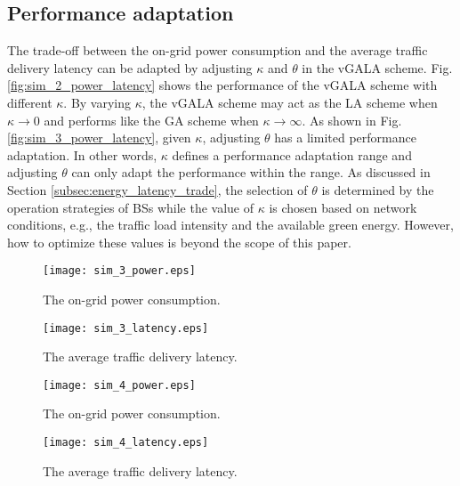 \documentclass[journal]{IEEEtran}
\theoremstyle{definition}
\begin{document}
\subsection{Performance adaptation}
The trade-off between the on-grid power consumption and the average traffic delivery latency can be adapted by adjusting $\kappa$ and $\theta$ in the vGALA scheme. Fig. \ref{fig:sim_2_power_latency} shows the performance of the vGALA scheme with different $\kappa$. By varying $\kappa$, the vGALA scheme may act as the LA scheme when $\kappa \rightarrow 0$ and performs like the GA scheme when $\kappa \rightarrow \infty$. As shown in Fig. \ref{fig:sim_3_power_latency}, given $\kappa$, adjusting $\theta$ has a limited performance adaptation. In other words, $\kappa$ defines a performance adaptation range and adjusting $\theta$ can only adapt the performance within the range. As discussed in Section \ref{subsec:energy_latency_trade}, the selection of $\theta$ is determined by the operation strategies of BSs while the value of $\kappa$ is chosen based on network conditions, e.g., the traffic load intensity and the available green energy. However, how to optimize these values is beyond the scope of this paper.


\begin{figure*}
\centering
\hspace*{\fill}
    \begin{subfigure}[b]{0.5\textwidth}
            \texttt{[image: sim\_3\_power.eps]}
            \caption{The on-grid power consumption.}
            \label{fig:sim_3_power}
    \end{subfigure}\begin{subfigure}[b]{0.5\textwidth}
            \texttt{[image: sim\_3\_latency.eps]}
            \caption{The average traffic delivery latency.}
            \label{fig:sim_3_latency}
   \end{subfigure}\hfill
    \caption{The performance of vGALA with various $\theta$ ($\kappa=4$).
     }\label{fig:sim_3_power_latency}
\end{figure*}

\begin{figure*}
\centering
\hspace*{\fill}
    \begin{subfigure}[b]{0.5\textwidth}
            \texttt{[image: sim\_4\_power.eps]}
            \caption{The on-grid power consumption.}
            \label{fig:sim_4_power}
    \end{subfigure}\begin{subfigure}[b]{0.5\textwidth}
            \texttt{[image: sim\_4\_latency.eps]}
            \caption{The average traffic delivery latency.}
            \label{fig:sim_4_latency}
   \end{subfigure}\hfill
       \caption{The performance of vGALA versus solar cell power efficiency ($\theta=0.8$, $\kappa=4$).
     }\label{fig:sim_4_power_latency}
   \vspace{-16pt}
\end{figure*}
\end{document}
